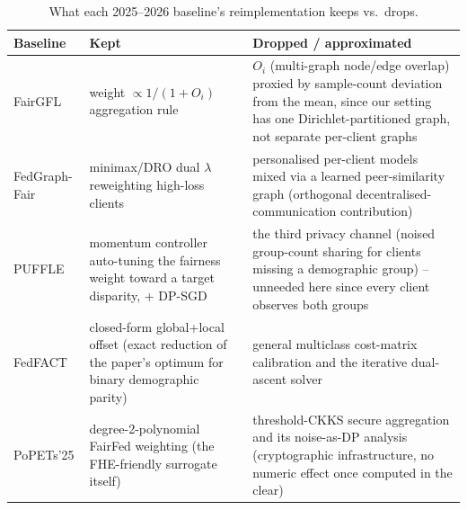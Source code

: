 \documentclass[pdflatex,sn-mathphys-num]{sn-jnl}
\theoremstyle{thmstyleone}%
\theoremstyle{thmstyletwo}%
\theoremstyle{thmstylethree}%
\begin{document}
\clearpage

\begin{table}[htbp]\centering\small
\caption{What each 2025--2026 baseline's reimplementation keeps vs.\ drops.}
\label{tab:baseline-fidelity}
\begin{tabular}{p{2.1cm}p{4.6cm}p{4.6cm}}
\toprule
Baseline & Kept & Dropped / approximated \\
\midrule
FairGFL & weight $\propto 1/(1{+}O_i)$ aggregation rule & $O_i$ (multi-graph
node/edge overlap) proxied by sample-count deviation from the mean, since our
setting has one Dirichlet-partitioned graph, not separate per-client graphs \\
FedGraph-Fair & minimax/DRO dual $\lambda$ reweighting high-loss clients &
personalised per-client models mixed via a learned peer-similarity graph
(orthogonal decentralised-communication contribution) \\
PUFFLE & momentum controller auto-tuning the fairness weight toward a target
disparity, + DP-SGD & the third privacy channel (noised group-count sharing
for clients missing a demographic group) -- unneeded here since every client
observes both groups \\
FedFACT & closed-form global+local offset (exact reduction of the paper's
optimum for binary demographic parity) & general multiclass cost-matrix
calibration and the iterative dual-ascent solver \\
PoPETs'25 & degree-2-polynomial FairFed weighting (the FHE-friendly surrogate
itself) & threshold-CKKS secure aggregation and its noise-as-DP analysis
(cryptographic infrastructure, no numeric effect once computed in the clear) \\
\bottomrule
\end{tabular}
\end{table}
\end{document}
